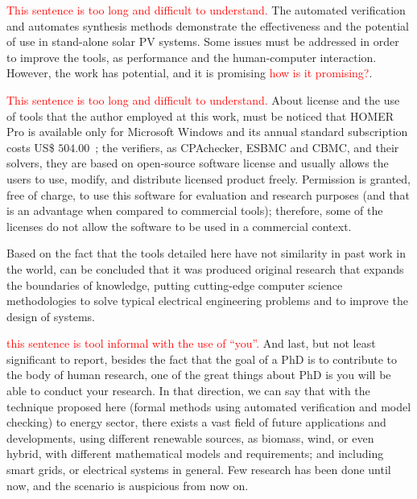 \textcolor{red}{This sentence is too long and difficult to understand.}
The automated verification and automates synthesis methods demonstrate the effectiveness and the potential of use in stand-alone solar PV systems. Some issues must be addressed in order to improve the tools, as performance and the human-computer interaction. However, the work has potential, and it is promising \textcolor{red}{how is it promising?}.

\textcolor{red}{This sentence is too long and difficult to understand.}
About license and the use of tools that the author employed at this work, must be noticed that HOMER Pro is available only for Microsoft Windows and its annual standard subscription costs US\$ $504.00$~\cite{HOMER}; the verifiers, as CPAchecker, ESBMC and CBMC, and their solvers, they are based on open-source software license and usually allows the users to use, modify, and distribute licensed product freely. Permission is granted, free of charge, to use this software for evaluation and research purposes (and that is an advantage when compared to commercial tools); therefore, some of the licenses do not allow the software to be used in a commercial context.

Based on the fact that the tools detailed here have not similarity in past work in the world, can be concluded that it was produced original research that expands the boundaries of knowledge, putting cutting-edge computer science methodologies to solve typical electrical engineering problems and to improve the design of systems.

\textcolor{red}{this sentence is tool informal with the use of ``you''.}
And last, but not least significant to report, besides the fact that the goal of a PhD is to contribute to the body of human research, one of the great things about PhD is you will be able to conduct your research. In that direction, we can say that with the technique proposed here (formal methods using automated verification and model checking) to energy sector, there exists a vast field of future applications and developments, using different renewable sources, as biomass, wind, or even hybrid, with different mathematical models and requirements; and including smart grids, or electrical systems in general. Few research has been done until now, and the scenario is auspicious from now on.

